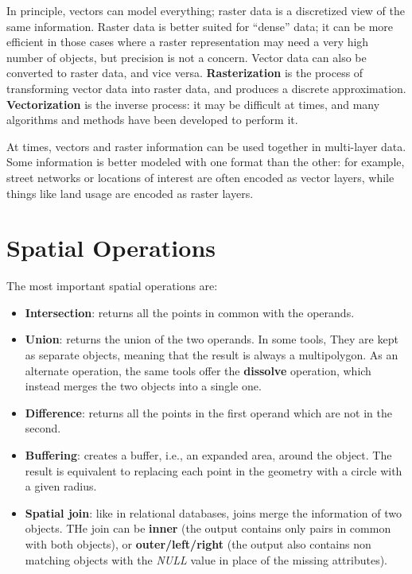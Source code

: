 In principle, vectors can model everything; raster data is a discretized view of the same information. Raster data is better suited for ``dense'' data; it can be more efficient in those cases where a raster representation may need a very high number of objects, but precision is not a concern. Vector data can also be converted to raster data, and vice versa. \textbf{Rasterization} is the process of transforming vector data into raster data, and produces a discrete approximation. \textbf{Vectorization} is the inverse process: it may be difficult at times, and many algorithms and methods have been developed to perform it.

At times, vectors and raster information can be used together in multi-layer data. Some information is better modeled with one format than the other: for example, street networks or locations of interest are often encoded as vector layers, while things like land usage are encoded as raster layers.

\section{Spatial Operations}

The most important spatial operations are:
\begin{itemize}
    \item \textbf{Intersection}: returns all the points in common with the operands.
    \item \textbf{Union}: returns the union of the two operands. In some tools, They are kept as separate objects, meaning that the result is always a multipolygon. As an alternate operation, the same tools offer the \textbf{dissolve} operation, which instead merges the two objects into a single one.
    \item \textbf{Difference}: returns all the points in the first operand which are not in the second.
    \item \textbf{Buffering}: creates a buffer, i.e., an expanded area, around the object. The result is equivalent to replacing each point in the geometry with a circle with a given radius.
    \item \textbf{Spatial join}: like in relational databases, joins merge the information of two objects. THe join can be \textbf{inner} (the output contains only pairs in common with both objects), or \textbf{outer/left/right} (the output also contains non matching objects with the \textit{NULL} value in place of the missing attributes). 
\end{itemize}

